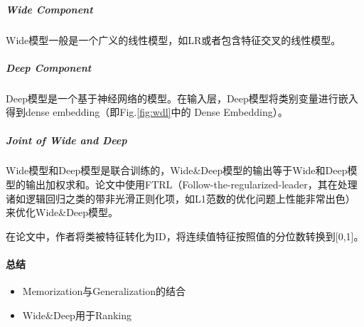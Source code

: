 \subparagraph{Wide Component}
Wide模型一般是一个广义的线性模型，如LR或者包含特征交叉的线性模型。

\subparagraph{Deep Component}
Deep模型是一个基于神经网络的模型。在输入层，Deep模型将类别变量进行嵌入得到dense embedding（即Fig.\ref{fig:wdl}中的 Dense Embedding）。

\subparagraph{Joint of Wide and Deep}
Wide模型和Deep模型是联合训练的，Wide\&Deep模型的输出等于Wide和Deep模型的输出加权求和。论文中使用FTRL（Follow-the-regularized-leader，其在处理诸如逻辑回归之类的带非光滑正则化项，如L1范数的优化问题上性能非常出色）\cite{mcmahan2011follow-the-regularized-leader}来优化Wide\&Deep模型。

在论文中，作者将类被特征转化为ID，将连续值特征按照值的分位数转换到[0,1]。


\paragraph{总结}

\begin{itemize}
	\item Memorization与Generalization的结合
	\item Wide\&Deep用于Ranking
\end{itemize}

